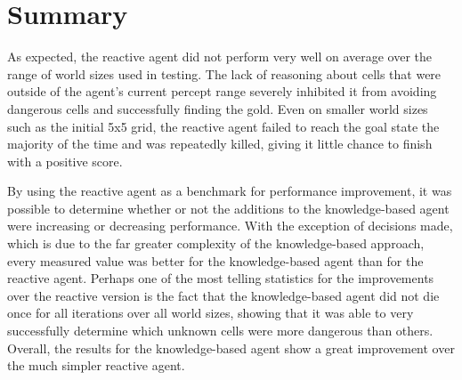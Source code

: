 \section{Summary}
As expected, the reactive agent did not perform very well on average over the range of world sizes used in testing.  The lack of reasoning about cells that were outside of the agent's current percept range severely inhibited it from avoiding dangerous cells and successfully finding the gold.  
Even on smaller world sizes such as the initial 5x5 grid, the reactive agent failed to reach the goal state the majority of the time and was repeatedly killed, giving it little chance to finish with a positive score. 

By using the reactive agent as a benchmark for performance improvement, it was possible to determine whether or not the additions to the knowledge-based agent were increasing or decreasing performance. 
With the exception of decisions made, which is due to the far greater complexity of the knowledge-based approach, every measured value was better for the knowledge-based agent than for the reactive agent. 
Perhaps one of the most telling statistics for the improvements over the reactive version is the fact that the knowledge-based agent did not die once for all iterations over all world sizes, showing that it was able to very successfully determine which unknown cells were more dangerous than others. Overall, the results for the knowledge-based agent show a great improvement over the much simpler reactive agent. 
